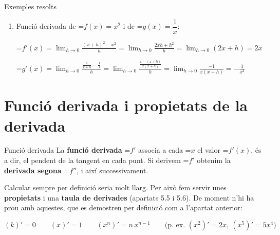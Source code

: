 \documentclass[11pt,a4paper]{article}
\newcommand{\fmm}[1]{\setbox0=\hbox{$#1$}\ifdim\wd0>\linewidth\[#1\]\else\mbox{\box0}\fi}
\begin{document}
\begin{fmex}{Exemples resolts}
\begin{enumerate}[label=\textbf{\arabic*.},leftmargin=*]
            \vspace*{0.4cm}

\fmm{g'(1)=\displaystyle\lim_{h\to0}\frac{-h^2+2h}{h}=\lim_{h\to0}(-h+2)=2}
\item Funció derivada de \fmm{f(x)=x^2} i de \fmm{g(x)=\dfrac1x}:
          
\vspace*{0.2cm}
            

\fmm{f'(x)=\displaystyle\lim_{h\to0}\frac{(x+h)^2-x^2}{h}=\lim_{h\to0}\frac{2xh+h^2}{h}=\lim_{h\to0}(2x+h)=2x}

            \vspace*{0.2cm}

\fmm{g'(x)=\displaystyle\lim_{h\to0}\frac{\frac{1}{x+h}-\frac1x}{h}=\lim_{h\to0}\frac{\frac{x-(x+h)}{x(x+h)}}{h}=\lim_{h\to0}\frac{-1}{x(x+h)}=-\frac{1}{x^2}}
\end{enumerate}
\end{fmex}

  
\section{Funció derivada i propietats de la derivada}\hypertarget{sec4}{}

  

  
\begin{fmdef}{Funció derivada}
La \textbf{funció derivada} \fmm{f'} associa a cada \fmm{x} el valor \fmm{f'(x)}, és a dir, el pendent de la tangent en cada punt. Si derivem \fmm{f'} obtenim la \textbf{derivada segona} \fmm{f''}, i així successivament.

      

Calcular sempre per definició seria molt llarg. Per això fem servir unes \textbf{propietats} i una \textbf{taula de derivades} (apartats 5.5 i 5.6). De moment n'hi ha prou amb aquestes, que es demostren per definició com a l'apartat anterior:

      
\[(k)'=0\qquad(x)'=1\qquad(x^n)'=n\,x^{n-1}\qquad\big(\text{p. ex. }(x^2)'=2x,\ (x^5)'=5x^4\big)\]

\end{fmdef}
\end{document}
